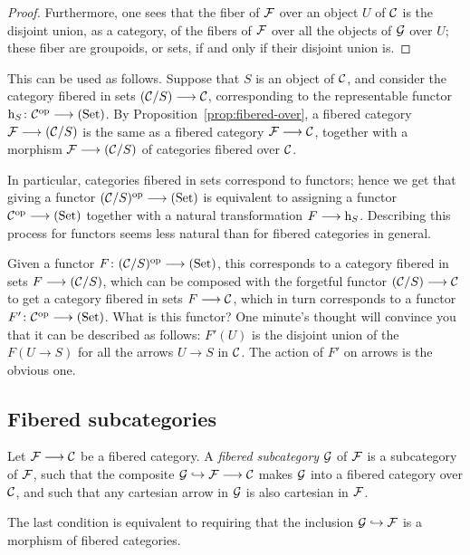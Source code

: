 \begin{3   FIBERED CATEGORIES}
\begin{3.4 Functors and cats fibered in sets}
\begin{proof}
Furthermore, one sees that the fiber of $\mathcal{F}$ over an object $U$ of $\mathcal{C}$ is the disjoint union, as a category, of the fibers of $\mathcal{F}$ over all the objects of $\mathcal{G}$ over $U$; these fiber are groupoids, or sets, if and only if their disjoint union is.
\end{proof}

This can be used as follows. Suppose that $S$ is an object of $\mathcal{C}$, and consider the category fibered in sets $(\cC/S) \arr \cC$, corresponding to the representable functor $\h_S \colon \cC\op \arr \catset$. By Proposition~\ref{prop:fibered-over}, a fibered category $\cF \arr (\cC/S)$ is the same as a fibered category $\cF \arr \cC$, together with a morphism $\cF\arr (\cC/S)$ of categories fibered over $\mathcal{C}$.

In particular, categories fibered in sets correspond to functors; hence we get that giving a functor $(\cC/S)\op \arr \catset$ is equivalent to assigning a functor $\cC\op \arr \catset$ together with a natural transformation $F \arr \h_{S}$. Describing this process for functors seems less natural than for fibered categories in general.

Given a functor $F \colon (\cC/S)\op \arr \catset$, this corresponds to a category fibered in sets $F \arr (\cC/S)$, which can be composed with the forgetful functor $(\cC/S) \arr \cC$ to get a category fibered in sets $F \arr \cC$, which in turn corresponds to a functor $F' \colon \cC\op \arr \catset$. What is this functor? One minute's thought will convince you that it can be described as follows: $F'(U)$ is the disjoint union of the $F(U \to S)$ for all the arrows $U \to S$ in $\mathcal{C}$. The action of $F'$ on arrows is the obvious one.



\subsection{Fibered subcategories}


\begin{definition}
Let $\cF\arr \cC$ be a fibered category. A \emph{fibered subcategory} $\mathcal{G}$ of $\mathcal{F}$ is a subcategory of $\mathcal{F}$, such that the composite $\cG \into \cF \arr \cC$ makes $\mathcal{G}$ into a fibered category over $\mathcal{C}$, and such that any cartesian arrow in $\mathcal{G}$ is also cartesian in $\mathcal{F}$.
\end{definition}

The last condition is equivalent to requiring that the inclusion
$\mathcal{G} \hookrightarrow \mathcal{F}$ is a morphism of fibered categories.


\end{3.4 Functors and cats fibered in sets}
\end{3   FIBERED CATEGORIES}
